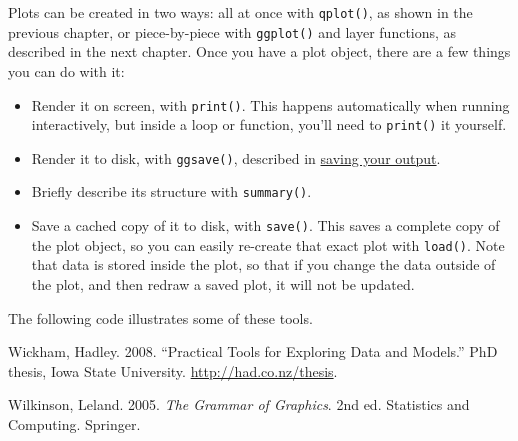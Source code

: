 Plots can be created in two ways: all at once with \texttt{qplot()}, as
shown in the previous chapter, or piece-by-piece with \texttt{ggplot()}
and layer functions, as described in the next chapter. Once you have a
plot object, there are a few things you can do with it:

\begin{itemize}
\item
  Render it on screen, with \texttt{print()}. This happens automatically
  when running interactively, but inside a loop or function, you'll need
  to \texttt{print()} it yourself. 
\item
  Render it to disk, with \texttt{ggsave()}, described in
  \hyperref[sec:saving]{saving your output}.
\item
  Briefly describe its structure with \texttt{summary()}.
\item
  Save a cached copy of it to disk, with \texttt{save()}. This saves a
  complete copy of the plot object, so you can easily re-create that
  exact plot with \texttt{load()}. Note that data is stored inside the
  plot, so that if you change the data outside of the plot, and then
  redraw a saved plot, it will not be updated. 
\end{itemize}

The following code illustrates some of these tools.

\begin{Shaded}
\begin{Highlighting}[]
\StringTok{ }  
\CommentTok{#> -----------------------------------}
\end{Highlighting}
\end{Shaded}

\begin{Shaded}
\begin{Highlighting}[]
 \NormalTok{)}
\NormalTok{(}\NormalTok{)}
\NormalTok{(}\NormalTok{, } \NormalTok{, } \NormalTok{)}
\end{Highlighting}
\end{Shaded}

Wickham, Hadley. 2008. ``Practical Tools for Exploring Data and
Models.'' PhD thesis, Iowa State University.
\url{http://had.co.nz/thesis}.

Wilkinson, Leland. 2005. \emph{The Grammar of Graphics}. 2nd ed.
Statistics and Computing. Springer.
